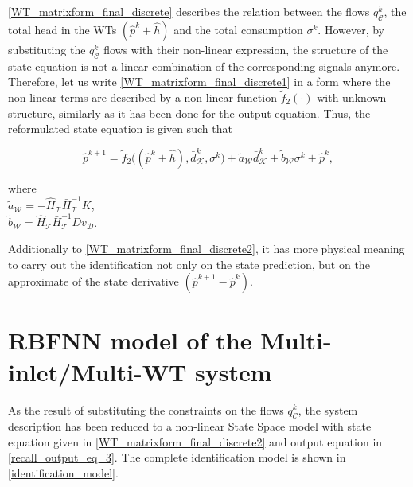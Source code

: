 \eqref{WT_matrixform_final_discrete} describes the relation between the flows $q^{k}_{\mathcal{C}}$, the total head in the WTs $(\hat{p}^{k} + \hat{h})$ and the total consumption $\sigma^{k}$. However, by substituting the $q^{k}_{\mathcal{C}}$ flows with their non-linear expression, the structure of the state equation is not a linear combination of the corresponding signals anymore. Therefore, let us write \eqref{WT_matrixform_final_discrete1} in a form where the non-linear terms are described by a non-linear function $\tilde{f}_2(\cdot)$ with unknown structure, similarly as it has been done for the output equation. Thus, the reformulated state equation is given such that

 \begin{equation}
  \label{WT_matrixform_final_discrete2}
     \hat{p}^{k+1}  = \tilde{f}_2 \big((\hat{p}^{k} + \hat{h}),\bar{d}^{k}_{\mathcal{K}}, \sigma^{k}\big) + \tilde{a}_{\mathcal{W}} \bar{d}^{k}_{\mathcal{K}} + \tilde{b}_{\mathcal{W}} \sigma^{k} + \hat{p}^{k},
\end{equation}

\vspace{-1mm} 

\begin{minipage}[t]{0.4\textwidth}
where\\
\hspace*{8mm} $\tilde{a}_{\mathcal{W}} = - \hat{H}_{\mathcal{T}} \bar{H}^{-1}_{\mathcal{T}} K $, \vspace*{1.5mm}\\
\hspace*{8mm} $\tilde{b}_{\mathcal{W}} = \hat{H}_{\mathcal{T}} \bar{H}^{-1}_{\mathcal{T}} D v_{\mathcal{D}} $.
\end{minipage}

Additionally to \eqref{WT_matrixform_final_discrete2}, it has more physical meaning to carry out the identification not only on the state prediction, but on the approximate of the state derivative $(\hat{p}^{k+1} \! - \!\hat{p}^{k})$. 

\section{RBFNN model of the Multi-inlet/Multi-WT system}
\label{RBFNN_model_multi_inlet_multi_WT_sys} 

As the result of substituting the constraints on the flows $q^{k}_{\mathcal{C}}$, the system description has been reduced to a non-linear State Space model with state equation given in \eqref {WT_matrixform_final_discrete2} and output equation in \eqref {recall_output_eq_3}. The complete identification model is shown in \eqref{identification_model}. 

